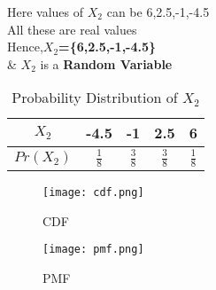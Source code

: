 \documentclass[11pt,a4paper,twocolumn]{article}
\begin{document}
Here values of $X_{2}$ can be 6,2.5,-1,-4.5\\
All these are real values\\
Hence,\textbf{$X_{2}$=\{6,2.5,-1,-4.5\}}\\
\& $X_2$ is a \textbf{Random Variable}
\begin{table}[h!]
    \centering
    \begin{tabular}{|c|c|c|c|c|}
    \hline
         $X_{2}$&-4.5&-1&2.5&6  \\
         \hline
         $Pr(X_{2})$&$\frac{1}{8}$&$\frac{3}{8}$&$\frac{3}{8}$&$\frac{1}{8}$\\
         \hline
    \end{tabular}
    \caption{Probability Distribution of $X_{2}$}
    \label{tab:my_label}
\end{table}
\begin{figure}[h!]
    \centering
    \texttt{[image: cdf.png]}
    \caption{CDF}
\end{figure}
\begin{figure}[h!]
    \centering
    \texttt{[image: pmf.png]}
    \caption{PMF}
\end{figure}
\end{document}

